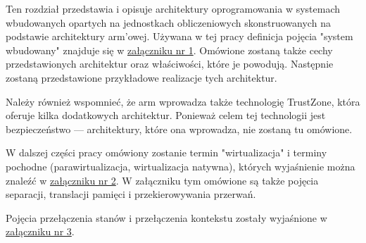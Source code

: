 \documentclass[../../main]{subfiles}
\begin{document}

Ten rozdział przedstawia i opisuje architektury oprogramowania w systemach wbudowanych opartych na jednostkach obliczeniowych skonstruowanych na podstawie architektury \acrshort{arm}'owej. Używana w tej pracy definicja pojęcia "system wbudowany" znajduje się w \hyperref[sec:zalacznik-1]{załączniku nr 1}. Omówione zostaną także cechy przedstawionych architektur oraz właściwości, które je powodują. Następnie zostaną przedstawione przykładowe realizacje tych architektur.

Należy również wspomnieć, że \acrshort{arm} wprowadza także technologię TrustZone, która oferuje kilka dodatkowych architektur. Ponieważ celem tej technologii jest bezpieczeństwo — architektury, które ona wprowadza, nie zostaną tu omówione.

W dalszej części pracy omówiony zostanie termin "wirtualizacja" i terminy pochodne (parawirtualizacja, wirtualizacja natywna), których wyjaśnienie można znaleźć w  \hyperref[sec:zalacznik-2]{załączniku nr 2}. W załączniku tym omówione są także pojęcia separacji, translacji pamięci i przekierowywania przerwań.

Pojęcia przełączenia stanów i przełączenia kontekstu zostały wyjaśnione w \hyperref[sec:zalacznik-3]{załączniku nr 3}.
\end{document}
